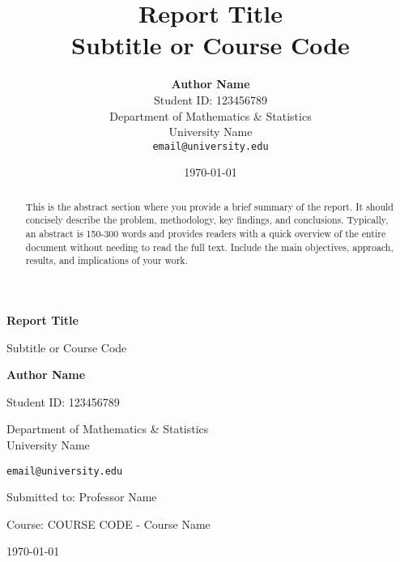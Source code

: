 \documentclass[12pt,a4paper]{article}
\title{
    \vspace{2cm}
    \textbf{\LARGE Report Title}\\
    \vspace{0.5cm}
    \large Subtitle or Course Code\\
    \vspace{1.5cm}
}
\author{
    \textbf{Author Name}\\
    Student ID: 123456789\\
    \vspace{0.5cm}
    Department of Mathematics \& Statistics\\
    University Name\\
    \vspace{0.5cm}
    \texttt{email@university.edu}
}
\date{\today}
\theoremstyle{definition}
\begin{document}
\begin{titlepage}
    \centering
    \vspace*{1cm}


    \vspace{1cm}

    {\Huge\bfseries Report Title\par}
    \vspace{0.5cm}
    {\Large Subtitle or Course Code\par}

    \vspace{2cm}

    {\Large\textbf{Author Name}\par}
    \vspace{0.3cm}
    {\large Student ID: 123456789\par}

    \vspace{1.5cm}

    {\large Department of Mathematics \& Statistics\\
    University Name\par}

    \vspace{1cm}

    {\large \texttt{email@university.edu}\par}

    \vfill

    {\large Submitted to: Professor Name\par}
    \vspace{0.3cm}
    {\large Course: COURSE CODE - Course Name\par}

    \vfill

    {\large \today\par}

\end{titlepage}

\newpage
\begin{abstract}
\noindent
This is the abstract section where you provide a brief summary of the report.
It should concisely describe the problem, methodology, key findings, and conclusions.
Typically, an abstract is 150-300 words and provides readers with a quick overview
of the entire document without needing to read the full text. Include the main
objectives, approach, results, and implications of your work.
\end{abstract}
\end{document}
